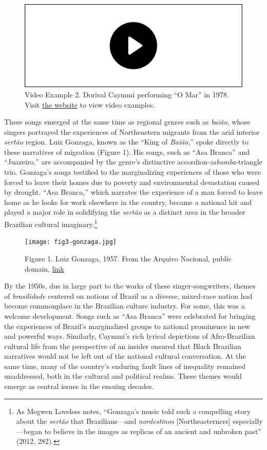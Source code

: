 \documentclass[twoside]{article}
\providecommand{\wmturlcaption}{
  Visit \href{https://worldmusictextbook.org/mcnally-2021}{the website} to view video examples.
}
\begin{document}
\begin{figure}
  \includegraphics[width=\textwidth]{../play-video.png}
  \caption*{Video Example 2. Dorival Caymmi performing ``O Mar'' in 1978. \wmturlcaption}
\end{figure}

These songs emerged at the same time as regional genres such as
\emph{baião}, whose singers portrayed the experiences of Northeastern
migrants from the arid interior \emph{sertão} region. Luiz Gonzaga,
known as the ``King of \emph{Baião},'' spoke directly to these
narratives of migration (Figure 1). His songs, such as ``Asa Branca''
and ``Juazeiro,'' are accompanied by the genre's distinctive
accordion-\emph{zabumba}-triangle trio. Gonzaga's songs testified to the
marginalizing experiences of those who were forced to leave their homes
due to poverty and environmental devastation caused by drought. ``Asa
Branca,'' which narrates the experience of a man forced to leave home as
he looks for work elsewhere in the country, became a national hit and
played a major role in solidifying the \emph{sertão} as a distinct area
in the broader Brazilian cultural imaginary.\footnote{As Megwen Loveless
  notes, ``Gonzaga's music told such a compelling story about the
  \emph{sertão} that Brazilians---and \emph{nordestinos}
  {[}Northeasterners{]} especially---began to believe in the images as
  replicas of an ancient and unbroken past'' (2012, 282).}

\begin{figure}
  \texttt{[image: fig3-gonzaga.jpg]}
  \caption{Figure 1. Luiz Gonzaga, 1957. From the Arquivo Nacional, public domain, \href{https://en.wikipedia.org/wiki/Luiz_Gonzaga\#/media/File:Luiz_Gonzaga_(1957).tif}{link}}
\end{figure}

By the 1950s, due in large part to the works of these
singer-songwriters, themes of \emph{brasilidade} centered on notions of
Brazil as a diverse, mixed-race nation had become commonplace in the
Brazilian culture industry. For some, this was a welcome development.
Songs such as ``Asa Branca'' were celebrated for bringing the
experiences of Brazil's marginalized groups to national prominence in
new and powerful ways. Similarly, Caymmi's rich lyrical depictions of
Afro-Brazilian cultural life from the perspective of an insider ensured
that Black Brazilian narratives would not be left out of the national
cultural conversation. At the same time, many of the country's enduring
fault lines of inequality remained unaddressed, both in the cultural and
political realms. These themes would emerge as central issues in the
ensuing decades.
\end{document}
